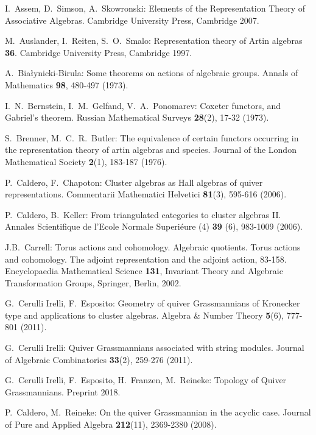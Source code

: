 \documentclass[smallextended,envcountsect,envcountsame]{svjour3}
\numberwithin{equation}{section}
\begin{document}
\begin{thebibliography}{10}

  I.~Assem, D.~Simson, A.~Skowronski: Elements of the Representation Theory of Associative Algebras. Cambridge University Press, Cambridge 2007.

  M.~Auslander, I.~Reiten, S.~O.~Smalo: Representation theory of Artin algebras {\bf 36}. Cambridge University Press, Cambridge 1997.

  A.~Bia\l{}ynicki-Birula: Some theorems on actions of algebraic groups. Annals of Mathematics \textbf{98}, 480-497 (1973).

  I.~N.~Bernstein, I.~M.~Gelfand, V.~A.~Ponomarev: Coxeter functors, and Gabriel's theorem. Russian Mathematical Surveys \textbf{28}(2), 17-32 (1973).

  S.~Brenner, M.~C.~R.~Butler: The equivalence of certain functors occurring in the representation theory of artin algebras and species. Journal of the London Mathematical Society \textbf{2}(1), 183-187 (1976).

  P.~Caldero, F.~Chapoton: Cluster algebras as {H}all algebras of quiver representations. Commentarii Mathematici Helvetici \textbf{81}(3), 595-616 (2006).

  P.~Caldero, B.~Keller: From triangulated categories to cluster algebras II.  Annales Scientifique de l'Ecole Normale Superi\'{e}ure (4) \textbf{39} (6), 983-1009 (2006).

	J.B.~Carrell: Torus actions and cohomology. Algebraic quotients. Torus actions and cohomology. The adjoint representation and the adjoint action, 83-158. Encyclopaedia Mathematical Science \textbf{131}, Invariant Theory and Algebraic Transformation Groups, Springer, Berlin, 2002.

  G.~Cerulli Irelli, F.~Esposito: Geometry of quiver Grassmannians of Kronecker type and applications to cluster algebras. Algebra \&  Number Theory \textbf{5}(6), 777-801 (2011).

 G.~Cerulli Irelli: Quiver Grassmannians associated with string modules. Journal of Algebraic Combinatorics \textbf{33}(2), 259-276 (2011).

  G.~Cerulli Irelli, F.~Esposito, H.~Franzen, M.~Reineke: Topology of Quiver Grassmannians. Preprint 2018.

  P.~Caldero, M.~Reineke: On the quiver Grassmannian in the acyclic case. Journal of Pure and Applied Algebra \textbf{212}(11), 2369-2380 (2008).


\end{thebibliography}
\end{document}
